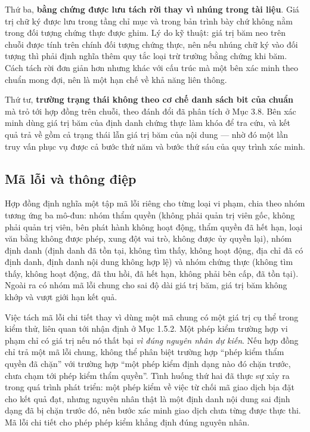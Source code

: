 Thứ ba, \textbf{bằng chứng được lưu tách rời thay vì nhúng trong tài liệu}. Giá trị chữ ký được lưu trong tầng chỉ mục và trong bản trình bày chứ không nằm trong đối tượng chứng thực được ghim. Lý do kỹ thuật: giá trị băm neo trên chuỗi được tính trên chính đối tượng chứng thực, nên nếu nhúng chữ ký vào đối tượng thì phải định nghĩa thêm quy tắc loại trừ trường bằng chứng khi băm. Cách tách rời đơn giản hơn nhưng khác với cấu trúc mà một bên xác minh theo chuẩn mong đợi, nên là một hạn chế về khả năng liên thông.

Thứ tư, \textbf{trường trạng thái không theo cơ chế danh sách bit của chuẩn} \cite{W3C_BitstringStatusList2025} mà trỏ tới hợp đồng trên chuỗi, theo đánh đổi đã phân tích ở Mục 3.8. Bên xác minh dùng giá trị băm của định danh chứng thực làm khóa để tra cứu, và kết quả trả về gồm cả trạng thái lẫn giá trị băm của nội dung --- nhờ đó một lần truy vấn phục vụ được cả bước thứ năm và bước thứ sáu của quy trình xác minh.

\subsection{Mã lỗi và thông điệp}

Hợp đồng định nghĩa một tập mã lỗi riêng cho từng loại vi phạm, chia theo nhóm tương ứng ba mô-đun: nhóm thẩm quyền (không phải quản trị viên gốc, không phải quản trị viên, bên phát hành không hoạt động, thẩm quyền đã hết hạn, loại văn bằng không được phép, xung đột vai trò, không được ủy quyền lại), nhóm định danh (định danh đã tồn tại, không tìm thấy, không hoạt động, địa chỉ đã có định danh, định danh nội dung không hợp lệ) và nhóm chứng thực (không tìm thấy, không hoạt động, đã thu hồi, đã hết hạn, không phải bên cấp, đã tồn tại). Ngoài ra có nhóm mã lỗi chung cho sai độ dài giá trị băm, giá trị băm không khớp và vượt giới hạn kết quả.

Việc tách mã lỗi chi tiết thay vì dùng một mã chung có một giá trị cụ thể trong kiểm thử, liên quan tới nhận định ở Mục 1.5.2. Một phép kiểm trường hợp vi phạm chỉ có giá trị nếu nó thất bại \emph{vì đúng nguyên nhân dự kiến}. Nếu hợp đồng chỉ trả một mã lỗi chung, không thể phân biệt trường hợp {``}phép kiểm thẩm quyền đã chặn{''} với trường hợp {``}một phép kiểm định dạng nào đó chặn trước, chưa chạm tới phép kiểm thẩm quyền{''}. Tình huống thứ hai đã thực sự xảy ra trong quá trình phát triển: một phép kiểm về việc từ chối mã giao dịch bịa đặt cho kết quả đạt, nhưng nguyên nhân thật là một định danh nội dung sai định dạng đã bị chặn trước đó, nên bước xác minh giao dịch chưa từng được thực thi. Mã lỗi chi tiết cho phép phép kiểm khẳng định đúng nguyên nhân.


